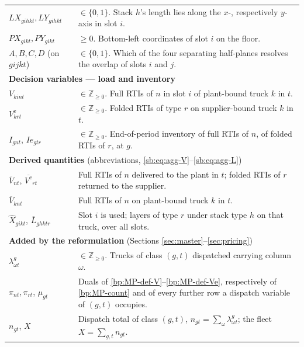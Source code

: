 \begin{longtable}[hbt!]{|p{}|p{}|}
    $LX_{gihkt},LY_{gihkt}$ & $\in\{0,1\}$. Stack $h$'s length lies along the $x$-,
                       respectively $y$-axis in slot $i$.\\
    $PX_{gikt},PY_{gikt}$ & $\ge 0$. Bottom-left coordinates of slot $i$ on the floor.\\
    $A,B,C,D$ (on $gijkt$) & $\in\{0,1\}$. Which of the four separating
                       half-planes resolves the overlap of slots $i$ and $j$.\\
    \hline
    \multicolumn{2}{|l|}{\textbf{Decision variables --- load and inventory}}\\\hline
    $V_{kint}$       & $\in\mathbb{Z}_{\ge 0}$. Full RTIs of $n$ in slot $i$ of
                       plant-bound truck $k$ in $t$.\\
    $V^{\mathrm{e}}_{krt}$ & $\in\mathbb{Z}_{\ge 0}$. Folded RTIs of type $r$ on
                       supplier-bound truck $k$ in $t$.\\
    $I_{gnt}$, $Ie_{gtr}$ & $\in\mathbb{Z}_{\ge 0}$. End-of-period inventory of full
                       RTIs of $n$, of folded RTIs of $r$, at $g$.\\
    \hline
    \multicolumn{2}{|l|}{\textbf{Derived quantities} (abbreviations, \eqref{sb:eq:agg-V}--\eqref{sb:eq:agg-L})}\\\hline
    $\overline{V}_{nt}$, $\overline{V^{\mathrm{e}}}_{rt}$ & Full RTIs of $n$ delivered
                       to the plant in $t$; folded RTIs of $r$ returned to the supplier.\\
    $\overline{V}_{knt}$ & Full RTIs of $n$ on plant-bound truck $k$ in $t$.\\
    $\widehat{X}_{gikt}$, $\overline{L}_{ghktr}$ & Slot $i$ is used; layers of type $r$
                       under stack type $h$ on that truck, over all slots.\\
    \hline
    \multicolumn{2}{|l|}{\textbf{Added by the reformulation} (Sections \ref{sec:master}--\ref{sec:pricing})}\\\hline
    $\lambda^{g}_{\omega t}$ & $\in\mathbb{Z}_{\ge0}$. Trucks of class $(g,t)$
                       dispatched carrying column $\omega$.\\
    $\pi_{nt},\pi_{rt}$, $\mu_{gt}$ & Duals of \eqref{bp:MP-def-V}--\eqref{bp:MP-def-Ve},
                       respectively of \eqref{bp:MP-count} and of every further row a
                       dispatch variable of $(g,t)$ occupies.\\
    $n_{gt}$, $X$    & Dispatch total of class $(g,t)$, $n_{gt}=\sum_{\omega}
                       \lambda^{g}_{\omega t}$; the fleet $X=\sum_{g,t}n_{gt}$.\\
    \hline
\end{longtable}
